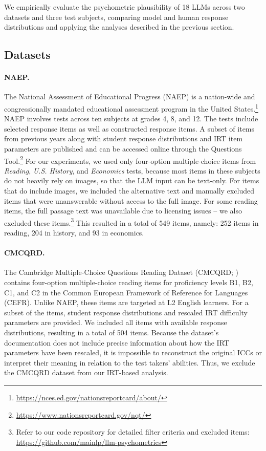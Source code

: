 \documentclass[11pt]{article}
\begin{document}
We empirically evaluate the psychometric plausibility of 18 LLMs across two datasets and three test subjects, comparing model and human response distributions and applying the analyses described in the previous section.

\subsection{Datasets}
\label{sec:experiment:datasets}

\paragraph{NAEP.}

The National Assessment of Educational Progress (NAEP) is a nation-wide and congressionally mandated educational assessment program in the United States.\footnote{\url{https://nces.ed.gov/nationsreportcard/about/}} NAEP involves tests across ten subjects at grades 4, 8, and 12. The tests include selected response items as well as constructed response items. A subset of items from previous years along with student response distributions and IRT item parameters are published and can be accessed online through the Questions Tool.\footnote{\url{https://www.nationsreportcard.gov/nqt/}} For our experiments, we used only four-option multiple-choice items from \emph{Reading}, \emph{U.S. History}, and \emph{Economics} tests, because most items in these subjects do not heavily rely on images, so that the LLM input can be text-only. For items that do include images, we included the alternative text and manually excluded items that were unanswerable without access to the full image. For some reading items, the full passage text was unavailable due to licensing issues -- we also excluded these items.\footnote{Refer to our code repository for detailed filter criteria and excluded items: \url{https://github.com/mainlp/llm-psychometrics}} This resulted in a total of 549 items, namely: 252 items in reading, 204 in history, and 93 in economics.

\paragraph{CMCQRD.}

The Cambridge Multiple-Choice Questions Reading Dataset (CMCQRD; \citealp{Mullooly2023}) contains four-option multiple-choice reading items for proficiency levels B1, B2, C1, and C2 in the Common European Framework of Reference for Languages (CEFR). Unlike NAEP, these items are targeted at L2 English learners. For a subset of the items, student response distributions and rescaled IRT difficulty parameters are provided. We included all items with available response distributions, resulting in a total of 504 items. Because the dataset's documentation does not include precise information about how the IRT parameters have been rescaled, it is impossible to reconstruct the original ICCs or interpret their meaning in relation to the test takers' abilities. Thus, we exclude the CMCQRD dataset from our IRT-based analysis.
\end{document}
